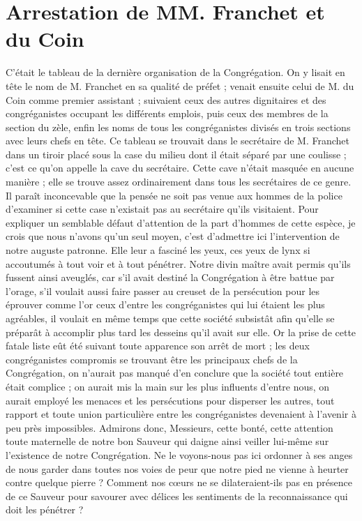 \section*{Arrestation de MM. Franchet et du Coin}
C'était le tableau de la dernière organisation de la Congrégation. On y lisait en tête le nom de M. Franchet en sa qualité de préfet ; venait ensuite celui de M. du Coin comme premier assistant ; suivaient ceux des autres dignitaires et des congréganistes occupant les différents emplois, puis ceux des membres de la section du zèle, enfin les noms de tous les congréganistes divisés en trois sections avec leurs chefs en tête. Ce tableau se trouvait dans le secrétaire de M. Franchet dans un tiroir placé sous la case du milieu dont il était séparé par une coulisse ; c'est ce qu'on appelle la cave du secrétaire. Cette cave n'était masquée en aucune manière ; elle se trouve assez ordinairement dans tous les secrétaires de ce genre. Il paraît inconcevable que la pensée ne soit pas venue aux hommes de la police d'examiner si cette case n'existait pas au secrétaire qu'ils visitaient. Pour expliquer un semblable défaut d'attention de la part d'hommes de cette espèce, je crois que nous n'avons qu'un seul moyen, c'est d'admettre ici l'intervention de notre auguste patronne. Elle leur a fasciné les yeux, ces yeux de lynx si accoutumés à tout voir et à tout pénétrer. Notre divin maître avait permis qu'ils fussent ainsi aveuglés, car s'il avait destiné la Congrégation à être battue par l'orage, s'il voulait aussi faire passer au creuset de la persécution pour les éprouver comme l'or ceux d'entre les congréganistes qui lui étaient les plus agréables, il voulait en même temps que cette société subsistât afin qu'elle se préparât à accomplir plus tard les desseins qu'il avait sur elle. Or la prise de cette fatale liste eût été suivant toute apparence son arrêt de mort ; les deux congréganistes compromis se trouvant être les principaux chefs de la Congrégation, on n'aurait pas manqué d'en conclure que la société tout entière était complice ;
on aurait mis la main sur les plus influents d'entre nous, on aurait employé les menaces et les persécutions pour disperser les autres, tout rapport et toute union particulière entre les congréganistes devenaient à l'avenir à peu près impossibles. Admirons donc, Messieurs, cette bonté, cette attention toute maternelle de notre bon Sauveur qui daigne ainsi veiller lui-même sur l'existence de notre Congrégation. Ne le voyons-nous pas ici ordonner à ses anges de nous garder dans toutes nos voies de peur que notre pied ne vienne à heurter contre quelque pierre ? Comment nos cœurs ne se dilateraient-ils pas en présence de ce Sauveur pour savourer avec délices les sentiments de la reconnaissance qui doit les pénétrer ?

